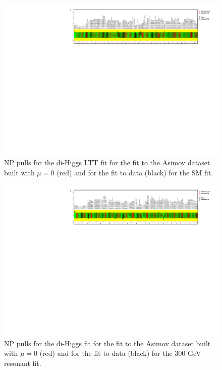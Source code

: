 \begin{figure}
\centering
\includegraphics[angle=270]{figures/results/HH/LepHad/NP_allExceptGammas_SM_LTT.pdf}
\caption{NP pulls for the di-Higgs \lephad LTT fit for the fit to the Asimov dataset built with $\mu=0$ (red) and for the fit to data (black) for the SM fit.}
\label{fig:LepHadPostfitNPPullsSMLTT}
\end{figure}

\begin{figure}
\centering
\includegraphics[angle=270]{figures/results/HH/LepHad/NP_allExceptGammas_2HDM300.pdf}
\caption{NP pulls for the di-Higgs \lephad fit for the fit to the Asimov dataset built with $\mu=0$ (red) and for the fit to data (black) for the 300 GeV resonant fit.}
\label{fig:LepHadPostfitNPPulls2HDM300}
\end{figure}

